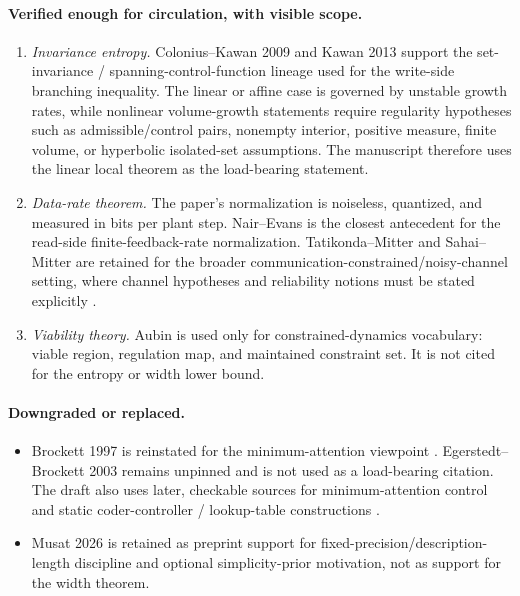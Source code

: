 \documentclass[11pt]{article}
\theoremstyle{definition}
\theoremstyle{remark}
\begin{document}
\paragraph{Verified enough for circulation, with visible scope.}
\begin{enumerate}
\item \emph{Invariance entropy.} Colonius--Kawan 2009 and Kawan 2013 \cite{colonius2009,kawan2013} support the set-invariance / spanning-control-function lineage used for the write-side branching inequality. The linear or affine case is governed by unstable growth rates, while nonlinear volume-growth statements require regularity hypotheses such as admissible/control pairs, nonempty interior, positive measure, finite volume, or hyperbolic isolated-set assumptions. The manuscript therefore uses the linear local theorem as the load-bearing statement.
\item \emph{Data-rate theorem.} The paper's normalization is noiseless, quantized, and measured in bits per plant step. Nair--Evans \cite{nair2000} is the closest antecedent for the read-side finite-feedback-rate normalization. Tatikonda--Mitter and Sahai--Mitter are retained for the broader communication-constrained/noisy-channel setting, where channel hypotheses and reliability notions must be stated explicitly \cite{tatikonda2004,sahai2006}.
\item \emph{Viability theory.} Aubin \cite{aubin1991} is used only for constrained-dynamics vocabulary: viable region, regulation map, and maintained constraint set. It is not cited for the entropy or width lower bound.
\end{enumerate}

\paragraph{Downgraded or replaced.}
\begin{itemize}
\item Brockett 1997 is reinstated for the minimum-attention viewpoint \cite{brockett1997}. Egerstedt--Brockett 2003 remains unpinned and is not used as a load-bearing citation. The draft also uses later, checkable sources for minimum-attention control and static coder-controller / lookup-table constructions \cite{lee2022,donkers2014,tomar2022}.
\item Musat 2026 \cite{musat2026} is retained as preprint support for fixed-precision/description-length discipline and optional simplicity-prior motivation, not as support for the width theorem.
\end{itemize}
\end{document}
